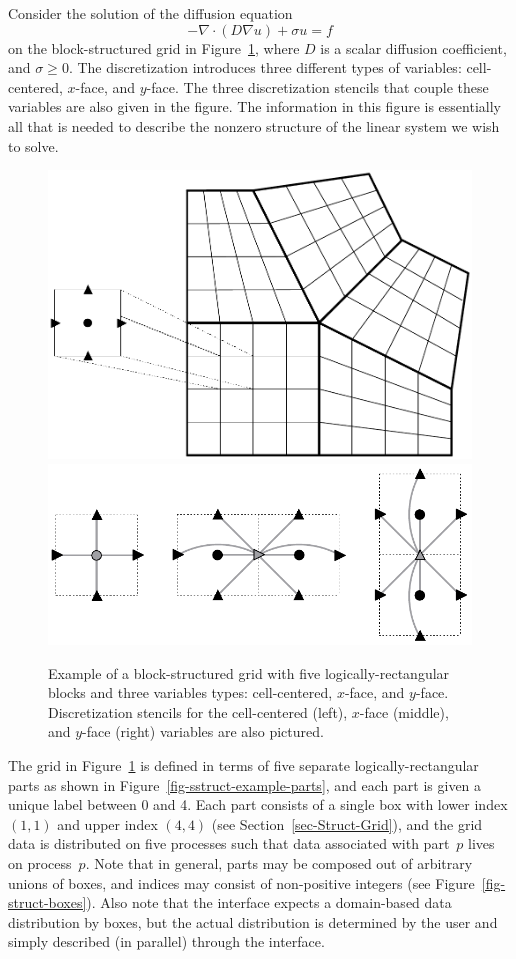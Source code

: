 Consider the solution of the diffusion equation
\begin{equation} \label{eqn-block-diffusion}
- \nabla \cdot (D \nabla u) + \sigma u = f
\end{equation}
on the block-structured grid in Figure~\ref{fig-sstruct-example}, where $D$ is
a scalar diffusion coefficient, and $\sigma \geq 0$.  The discretization
\cite{JEMorel_RMRoberts_MJShashkov_1998} introduces three different types of
variables: cell-centered, $x$-face, and $y$-face.  The three discretization
stencils that couple these variables are also given in the figure.  The
information in this figure is essentially all that is needed to describe the
nonzero structure of the linear system we wish to solve.
\begin{figure}
\centering
\includegraphics[width=.4\textwidth]{figSStructExample1a}
\hfill
\includegraphics[width=.4\textwidth]{figSStructExample1b}
\caption{%
Example of a block-structured grid with five logically-rectangular blocks and
three variables types: cell-centered, $x$-face, and $y$-face.  Discretization
stencils for the cell-centered (left), $x$-face (middle), and $y$-face (right)
variables are also pictured.}
\label{fig-sstruct-example}
\end{figure}

The grid in Figure~\ref{fig-sstruct-example} is defined in terms of five
separate logically-rectangular parts as shown in
Figure~\ref{fig-sstruct-example-parts}, and each part is given a unique label
between 0 and 4.  Each part consists of a single box with lower index $(1,1)$
and upper index $(4,4)$ (see Section~\ref{sec-Struct-Grid}), and the grid data
is distributed on five processes such that data associated with part~$p$ lives
on process~$p$.  Note that in general, parts may be composed out of arbitrary
unions of boxes, and indices may consist of non-positive integers (see
Figure~\ref{fig-struct-boxes}).  Also note that the  interface
expects a domain-based data distribution by boxes, but the actual distribution
is determined by the user and simply described (in parallel) through the
interface.

